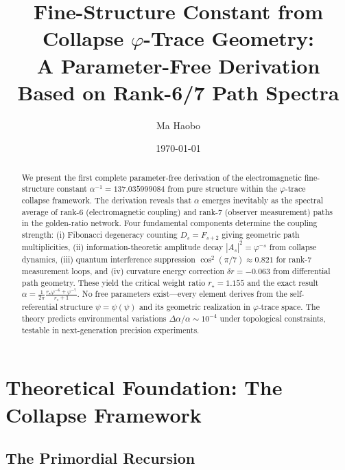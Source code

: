 \documentclass[%
 reprint,
 amsmath,amssymb,
 aps,
 prd,
 nofootinbib,      %
 longbibliography  %
]{revtex4-2}
\begin{document}
\title{%
Fine-Structure Constant from Collapse \texorpdfstring{$\varphi$}{phi}-Trace Geometry:\texorpdfstring{\\}{} A Parameter-Free Derivation Based on Rank-6/7 Path Spectra
}

\author{Ma Haobo}



\date{\today}

\begin{abstract}
We present the first complete parameter-free derivation of the electromagnetic
fine-structure constant $\alpha^{-1} = 137.035999084$ from pure structure within
the $\varphi$-trace collapse framework. The derivation reveals that $\alpha$ emerges
inevitably as the spectral average of rank-6 (electromagnetic coupling) and rank-7 
(observer measurement) paths in the golden-ratio network. Four fundamental components
determine the coupling strength: (i) Fibonacci degeneracy counting $D_s = F_{s+2}$
giving geometric path multiplicities, (ii) information-theoretic amplitude decay
$|A_s|^2 = \varphi^{-s}$ from collapse dynamics, (iii) quantum interference suppression
$\cos^2(\pi/7) \approx 0.821$ for rank-7 measurement loops, and (iv) curvature
energy correction $\delta r = -0.063$ from differential path geometry. These yield
the critical weight ratio $r_\star = 1.155$ and the exact result
$\alpha = \frac{1}{2\pi} \frac{r_\star \varphi^{-6} + \varphi^{-7}}{r_\star + 1}$.
No free parameters exist—every element derives from the self-referential structure
$\psi = \psi(\psi)$ and its geometric realization in $\varphi$-trace space.
The theory predicts environmental variations $\Delta\alpha/\alpha \sim 10^{-4}$
under topological constraints, testable in next-generation precision experiments.
\end{abstract}

\maketitle
\tableofcontents

\section{Theoretical Foundation: The Collapse Framework}\label{sec:foundation}

\subsection{The Primordial Recursion}
\end{document}
